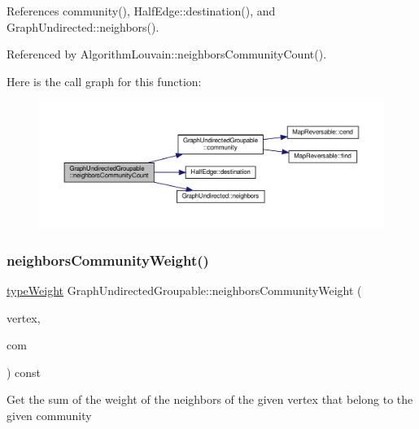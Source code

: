 References community(), Half\+Edge\+::destination(), and Graph\+Undirected\+::neighbors().



Referenced by Algorithm\+Louvain\+::neighbors\+Community\+Count().

Here is the call graph for this function\+:
\nopagebreak
\begin{figure}[H]
\begin{center}
\leavevmode
\includegraphics[width=350pt]{classGraphUndirectedGroupable_ae5d9459c76d6104345547eaa3e79a088_cgraph}
\end{center}
\end{figure}
\mbox{\label{classGraphUndirectedGroupable_a24c1e8303eefff2635f7462d3cf1c6cf}} 
\subsubsection{\texorpdfstring{neighbors\+Community\+Weight()}{neighborsCommunityWeight()}\hspace{0.1cm}{\footnotesize\ttfamily [1/2]}}
{\footnotesize\ttfamily \hyperlink{edge_8h_a2e7ea3be891ac8b52f749ec73fee6dd2}{type\+Weight} Graph\+Undirected\+Groupable\+::neighbors\+Community\+Weight (\begin{DoxyParamCaption}\item[{const \hyperlink{edge_8h_a5fbd20c46956d479cb10afc9855223f6}{type\+Vertex} \&}]{vertex,  }\item[{const \hyperlink{graphUndirectedGroupable_8h_a914da95c9ea7f14f4b7f875c36818556}{type\+Community} \&}]{com }\end{DoxyParamCaption}) const\hspace{0.3cm}{\ttfamily [inline]}}

Get the sum of the weight of the neighbors of the given vertex that belong to the given community


